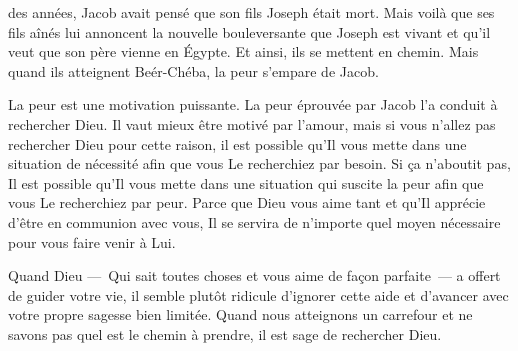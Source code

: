 \dvrule






 des années,
 Jacob avait pensé que son fils Joseph était mort.
 Mais voilà que ses fils aînés lui annoncent la nouvelle bouleversante
 que Joseph est vivant et qu'il veut que son père vienne en Égypte.
 Et ainsi, ils se mettent en chemin.
 Mais quand ils atteignent Beér-Chéba, la peur s'empare de Jacob. 

La peur est une motivation puissante.
 La peur éprouvée par Jacob l'a conduit à rechercher Dieu.
 Il vaut mieux être motivé par l'amour,
 mais si vous n'allez pas rechercher Dieu pour cette raison,
 il est possible qu'Il vous mette dans une situation de nécessité
 afin que vous Le recherchiez par besoin.
 Si ça n'aboutit pas, Il est possible qu'Il vous mette
 dans une situation qui suscite la peur afin que vous Le recherchiez par peur.
 Parce que Dieu vous aime tant et qu'Il apprécie d'être en communion avec vous,
 Il se servira de n'importe quel moyen nécessaire pour vous faire venir à Lui.


Quand Dieu ---~Qui sait toutes choses et vous aime de façon parfaite~---
 a offert de guider votre vie, il semble plutôt ridicule d'ignorer
 cette aide et d'avancer avec votre propre sagesse bien limitée.
 Quand nous atteignons un carrefour et ne savons pas
 quel est le chemin à prendre, il est sage de rechercher Dieu. 

\dvrule




